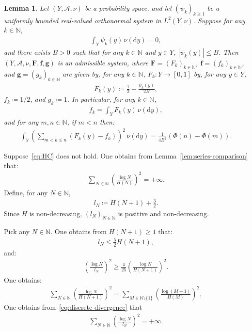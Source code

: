 \documentclass[12pt,reqno]{amsart}
\theoremstyle{definition}
\theoremstyle{plain}
\newtheorem{lemma}{Lemma}
\begin{document}
\begin{lemma}\label{lem:affine-embedding}
Let $(Y,\mathcal A,\nu)$ be a probability space, and let $(\psi_k)_{k\geq1}$ be a uniformly bounded real-valued orthonormal system in $L^2(Y,\nu)$. Suppose for any $k\in\mathbb{N}$,
\begin{align*}
    \int_Y\psi_k(y)\,\nu(\mathrm dy)=0,
\end{align*}
and there exists $B>0$ such that for any $k\in\mathbb{N}$ and $y\in Y$, $|\psi_k(y)|\leq B$.
Then $(Y,\mathcal A,\nu,\mathbf F,\mathbf f,\mathbf g)$ is an admissible system, where $\mathbf F=(F_k)_{k\in\mathbb{N}}$, $\mathbf f=(f_k)_{k\in\mathbb{N}}$, and $\mathbf g=(g_k)_{k\in\mathbb{N}}$ are given by, for any $k\in\mathbb{N}$, $F_k:Y\to[0,1]$ by, for any $y \in Y$,
\begin{align*}
    F_k(y)\coloneqq\frac12+\frac{\psi_k(y)}{2B},
\end{align*}
$f_k\coloneqq1/2$, and $g_k\coloneqq1$. In particular, for any $k\in\mathbb{N}$,
\begin{align*}
    f_k=\int_YF_k(y)\,\nu(\mathrm dy),
\end{align*}
and for any $m,n\in\mathbb{N}$, if $m<n$ then:
\begin{align*}
    \int_Y
    \left(
        \sum_{m<k\leq n}(F_k(y)-f_k)
    \right)^2
    \,\nu(\mathrm dy)
    =
    \frac{1}{4B^2}\left(\Phi(n)-\Phi(m)\right).
\end{align*}
\end{lemma}

Suppose~\eqref{eq:HC} does not hold. One obtains from Lemma~\ref{lem:series-comparison} that:
\begin{align}
\label{eq:discrete-divergence}
    \sum_{N\in\mathbb{N}}\left(\frac{\log N}{H(N)}\right)^2=+\infty.
\end{align}
Define, for any $N\in\mathbb{N}$, 
\begin{align*}
    l_N
    \coloneqq
    H(N+1)+\frac32.
\end{align*}
Since $H$ is non-decreasing, $(l_N)_{N\in\mathbb{N}}$ is positive and non-decreasing.

Pick any $N\in\mathbb{N}$. One obtains from $H(N+1)\geq1$ that:
\begin{align*}
    l_N
    \leq
    \frac52 H(N+1),
\end{align*}
and:
\begin{align*}
    \left(\frac{\log N}{l_N}\right)^2
    \geq
    \frac4{25}
    \left(\frac{\log N}{H(N+1)}\right)^2.
\end{align*}
One obtains:
\begin{align*}
    \sum_{N\in\mathbb{N}}
    \left(\frac{\log N}{H(N+1)}\right)^2
    =
    \sum_{M\in\mathbb{N}\setminus\{1\}}
    \left(\frac{\log{(M-1)}}{H(M)}\right)^2,
\end{align*}
One obtains from~\eqref{eq:discrete-divergence} that
\begin{align*}
    \sum_{N\in\mathbb{N}}
    \left(\frac{\log N}{l_N}\right)^2
    =+\infty.
\end{align*}
\end{document}
